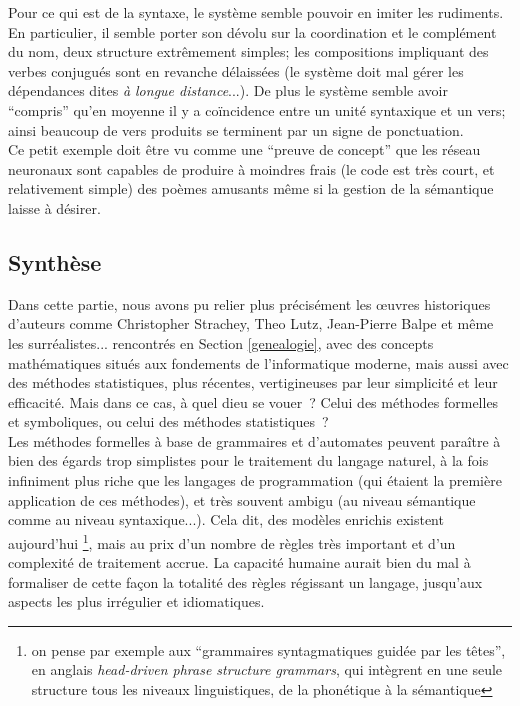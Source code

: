 \documentclass{article}
\begin{document}
					Pour ce qui est de la syntaxe, le système semble pouvoir en imiter les rudiments. En particulier, il semble porter son dévolu sur la coordination et le complément du nom, deux structure extrêmement simples; les compositions impliquant des verbes conjugués sont en revanche délaissées (le système doit mal gérer les dépendances dites \textit{à longue distance}...). De plus le système semble avoir ``compris'' qu'en moyenne il y a coïncidence entre un unité syntaxique et un vers; ainsi beaucoup de vers produits se terminent par un signe de ponctuation.\\
					
					Ce petit exemple doit être vu comme une ``preuve de concept'' que les réseau neuronaux sont capables de produire à moindres frais (le code est très court, et relativement simple) des poèmes amusants même si la gestion de la sémantique laisse à désirer.
					
		\subsection{Synthèse}
			Dans cette partie, nous avons pu relier plus précisément les œuvres historiques d'auteurs comme Christopher Strachey, Theo Lutz, Jean-Pierre Balpe et même les surréalistes... rencontrés en Section \ref{genealogie}, avec des concepts mathématiques situés aux fondements de l'informatique moderne, mais aussi avec des méthodes statistiques, plus récentes, vertigineuses par leur simplicité et leur efficacité. Mais dans ce cas, à quel dieu se vouer~? Celui des méthodes formelles et symboliques, ou celui des méthodes statistiques~?\\
				
			Les méthodes formelles à base de grammaires et d'automates peuvent paraître à bien des égards trop simplistes pour le traitement du langage naturel, à la fois infiniment plus riche que les langages de programmation (qui étaient la première application de ces méthodes), et très souvent ambigu (au niveau sémantique comme au niveau syntaxique...). Cela dit, des modèles enrichis existent aujourd'hui \footnote{on pense par exemple aux ``grammaires syntagmatiques guidée par les têtes'', en anglais \textit{head-driven phrase structure grammars}, qui intègrent en une seule structure tous les niveaux linguistiques, de la phonétique à la sémantique}, mais au prix d'un nombre de règles très important et d'un complexité de traitement accrue. La capacité humaine aurait bien du mal à formaliser de cette façon la totalité des règles régissant un langage, jusqu'aux aspects les plus irrégulier et idiomatiques.
			
\end{document}
